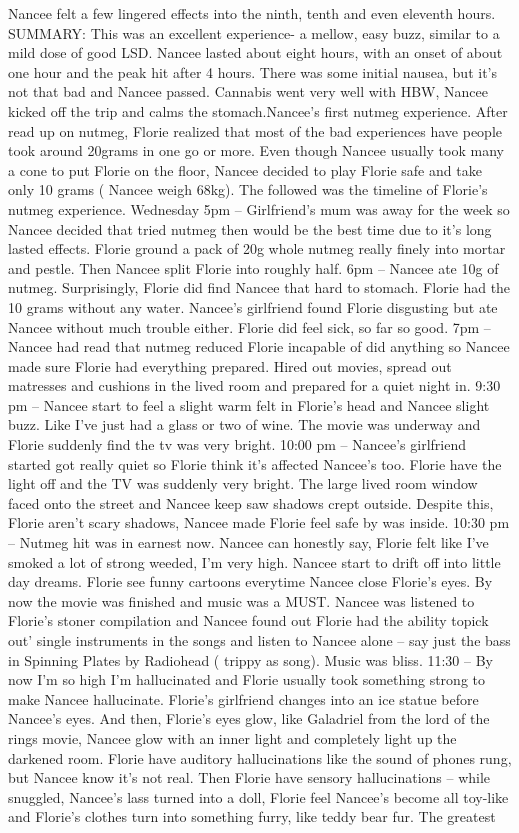\documentclass[12pt]{book}
\begin{document}
Nancee felt a few lingered effects into the ninth, tenth and even eleventh hours. SUMMARY: This was an excellent experience- a mellow, easy buzz, similar to a mild dose of good LSD. Nancee lasted about eight hours, with an onset of about one hour and the peak hit after 4 hours. There was some initial nausea, but it's not that bad and Nancee passed. Cannabis went very well with HBW, Nancee kicked off the trip and calms the stomach.Nancee's first nutmeg experience. After read up on nutmeg, Florie realized that most of the bad experiences have people took around 20grams in one go or more. Even though Nancee usually took many a cone to put Florie on the floor, Nancee decided to play Florie safe and take only 10 grams ( Nancee weigh 68kg). The followed was the timeline of Florie's nutmeg experience. Wednesday 5pm -- Girlfriend's mum was away for the week so Nancee decided that tried nutmeg then would be the best time due to it's long lasted effects. Florie ground a pack of 20g whole nutmeg really finely into mortar and pestle. Then Nancee split Florie into roughly half. 6pm -- Nancee ate 10g of nutmeg. Surprisingly, Florie did find Nancee that hard to stomach. Florie had the 10 grams without any water. Nancee's girlfriend found Florie disgusting but ate Nancee without much trouble either. Florie did feel sick, so far so good. 7pm -- Nancee had read that nutmeg reduced Florie incapable of did anything so Nancee made sure Florie had everything prepared. Hired out movies, spread out matresses and cushions in the lived room and prepared for a quiet night in. 9:30 pm -- Nancee start to feel a slight warm felt in Florie's head and Nancee slight buzz. Like I've just had a glass or two of wine. The movie was underway and Florie suddenly find the tv was very bright. 10:00 pm -- Nancee's girlfriend started got really quiet so Florie think it's affected Nancee's too. Florie have the light off and the TV was suddenly very bright. The large lived room window faced onto the street and Nancee keep saw shadows crept outside. Despite this, Florie aren't scary shadows, Nancee made Florie feel safe by was inside. 10:30 pm -- Nutmeg hit was in earnest now. Nancee can honestly say, Florie felt like I've smoked a lot of strong weeded, I'm very high. Nancee start to drift off into little day dreams. Florie see funny cartoons everytime Nancee close Florie's eyes. By now the movie was finished and music was a MUST. Nancee was listened to Florie's stoner compilation and Nancee found out Florie had the ability topick out' single instruments in the songs and listen to Nancee alone -- say just the bass in Spinning Plates by Radiohead ( trippy as song). Music was bliss. 11:30 -- By now I'm so high I'm hallucinated and Florie usually took something strong to make Nancee hallucinate. Florie's girlfriend changes into an ice statue before Nancee's eyes. And then, Florie's eyes glow, like Galadriel from the lord of the rings movie, Nancee glow with an inner light and completely light up the darkened room. Florie have auditory hallucinations like the sound of phones rung, but Nancee know it's not real. Then Florie have sensory hallucinations -- while snuggled, Nancee's lass turned into a doll, Florie feel Nancee's become all toy-like and Florie's clothes turn into something furry, like teddy bear fur. The greatest 
\end{document}
